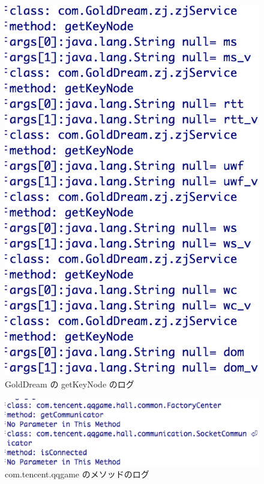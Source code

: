 \begin{figure}[t]
\begin{center}
\graphicspath{{./epsfiles/}}
\includegraphics[scale=0.2]{getkeynodezjservice.eps}
\end{center}
\caption{GoldDream の getKeyNode のログ}
\label{zjservicegetkey}
\end{figure}

\begin{figure}[t]
\begin{center}
\graphicspath{{./epsfiles/}}
\includegraphics[scale=0.45]{qqgame.eps}
\end{center}
\caption{com.tencent.qqgame のメソッドのログ}
\label{qqgame}
\end{figure}

